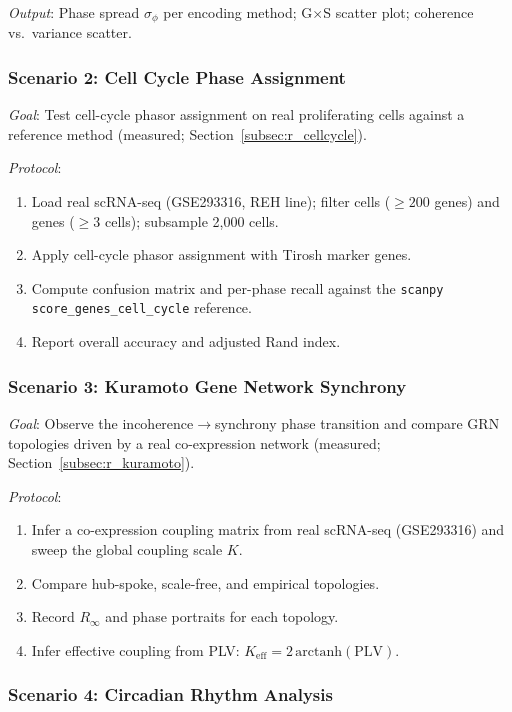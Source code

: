 \documentclass[preprint,12pt,amsmath,amssymb,superscriptaddress,floatfix]{revtex4-2}
\begin{document}
\textit{Output}: Phase spread $\sigma_\phi$ per encoding method;
G$\times$S scatter plot; coherence vs.\ variance scatter.

\subsubsection{Scenario 2: Cell Cycle Phase Assignment}

\textit{Goal}: Test cell-cycle phasor assignment on real proliferating cells
against a reference method (measured; Section~\ref{subsec:r_cellcycle}).

\textit{Protocol}:
\begin{enumerate}
    \item Load real scRNA-seq (GSE293316, REH line); filter cells
    ($\geq 200$ genes) and genes ($\geq 3$ cells); subsample 2{,}000 cells.
    \item Apply cell-cycle phasor assignment with Tirosh marker genes.
    \item Compute confusion matrix and per-phase recall against the
    \texttt{scanpy} \texttt{score\_genes\_cell\_cycle} reference.
    \item Report overall accuracy and adjusted Rand index.
\end{enumerate}

\subsubsection{Scenario 3: Kuramoto Gene Network Synchrony}

\textit{Goal}: Observe the incoherence$\to$synchrony phase transition and
compare GRN topologies driven by a real co-expression network
(measured; Section~\ref{subsec:r_kuramoto}).

\textit{Protocol}:
\begin{enumerate}
    \item Infer a co-expression coupling matrix from real scRNA-seq
    (GSE293316) and sweep the global coupling scale $K$.
    \item Compare hub-spoke, scale-free, and empirical topologies.
    \item Record $R_\infty$ and phase portraits for each topology.
    \item Infer effective coupling from PLV: $K_{\mathrm{eff}} = 2\,\mathrm{arctanh}(\mathrm{PLV})$.
\end{enumerate}

\subsubsection{Scenario 4: Circadian Rhythm Analysis}
\end{document}
